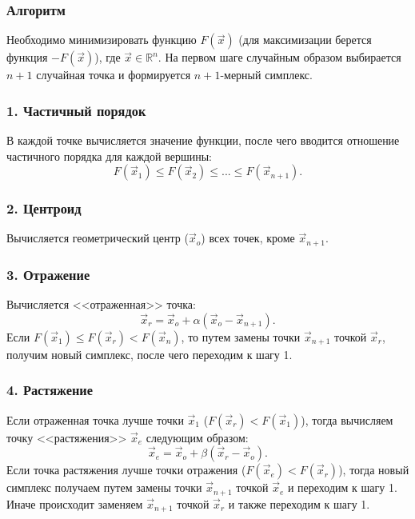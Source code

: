 \subsubsection{Алгоритм}
\noindent\indent Необходимо минимизировать функцию $F(\vec{x})$ (для максимизации
берется функция $-F(\vec{x})$), где $\vec{x} \in \mathbb{R}^n$. На первом
шаге случайным образом выбирается $n+1$ случайная точка и формируется $n+1$-мерный
симплекс.\par
\subsubsection{1. Частичный порядок}
\noindent\indent В каждой точке вычисляется значение функции, после чего вводится
отношение частичного порядка для каждой вершины:
\begin{equation}
  F(\vec{x}_1) \leq F(\vec{x}_2) \leq ... \leq F(\vec{x}_{n+1}).
\end{equation}
\subsubsection{2. Центроид}
\noindent\indent Вычисляется геометрический центр ($\vec{x}_{o}$) всех точек,
кроме $\vec{x}_{n+1}$.
\subsubsection{3. Отражение}
\noindent\indent Вычисляется <<отраженная>> точка:
\begin{equation}
  \vec{x}_r = \vec{x}_o + \alpha(\vec{x}_o - \vec{x}_{n+1}).
\end{equation}
Если $F(\vec{x}_1) \leq F(\vec{x}_r) < F(\vec{x}_n)$, то
путем замены точки $\vec{x}_{n+1}$ точкой $\vec{x}_r$, получим новый симплекс,
после чего переходим к шагу 1.
\subsubsection{4. Растяжение}
\noindent\indent Если отраженная точка лучше точки $\vec{x}_1$
($F(\vec{x}_r) < F(\vec{x}_1) $), тогда вычисляем точку <<растяжения>>
$\vec{x}_e$ следующим образом:
\begin{equation}
  \vec{x}_e = \vec{x}_o + \beta(\vec{x}_r - \vec{x}_o).
\end{equation}
Если точка растяжения лучше точки отражения ($F(\vec{x}_e) < F(\vec{x}_r)$),
тогда новый симплекс получаем путем замены точки $\vec{x}_{n+1}$ точкой
$\vec{x}_e$ и переходим к шагу 1.
Иначе происходит заменяем $\vec{x}_{n+1}$ точкой $\vec{x}_r$ и также переходим
к шагу 1.
